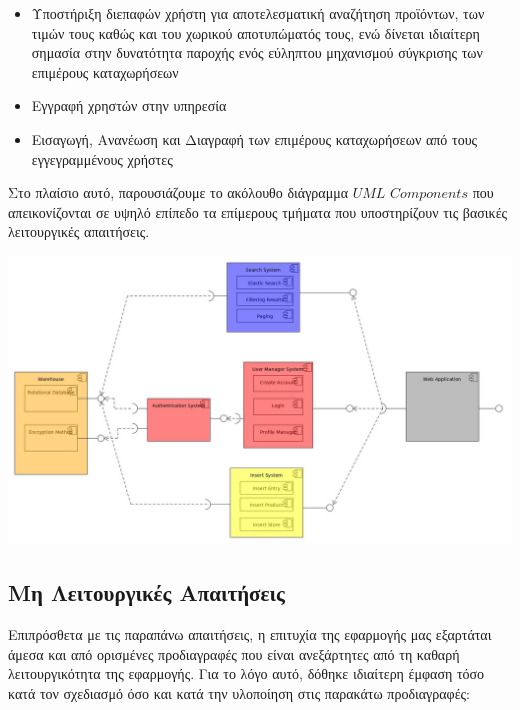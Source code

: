 \documentclass[12pt]{article}
\begin{document}
\begin{itemize}
\item Υποστήριξη διεπαφών χρήστη για αποτελεσματική αναζήτηση προϊόντων, των τιμών τους καθώς και του χωρικού αποτυπώματός τους, ενώ δίνεται ιδιαίτερη σημασία στην δυνατότητα παροχής ενός εύληπτου μηχανισμού σύγκρισης των επιμέρους καταχωρήσεων
\item Εγγραφή χρηστών στην υπηρεσία 
\item Εισαγωγή, Ανανέωση και Διαγραφή των επιμέρους καταχωρήσεων από τους εγγεγραμμένους χρήστες
\end{itemize}

Στο πλαίσιο αυτό, παρουσιάζουμε το ακόλουθο διάγραμμα $UML$ $Components$ που απεικονίζονται σε υψηλό επίπεδο τα επίμερους τμήματα που υποστηρίζουν τις βασικές λειτουργικές απαιτήσεις.

\begin{center}
\includegraphics[scale=0.34]{UML/componentDiagram.jpg}
\end{center}

\newpage

\subsection{Μη Λειτουργικές Απαιτήσεις}

Επιπρόσθετα με τις παραπάνω απαιτήσεις, η επιτυχία της εφαρμογής μας εξαρτάται άμεσα και από ορισμένες προδιαγραφές που είναι ανεξάρτητες από τη καθαρή λειτουργικότητα της εφαρμογής. Για το λόγο αυτό, δόθηκε ιδιαίτερη έμφαση τόσο κατά τον σχεδιασμό όσο και κατά την υλοποίηση στις παρακάτω προδιαγραφές:
\end{document}
